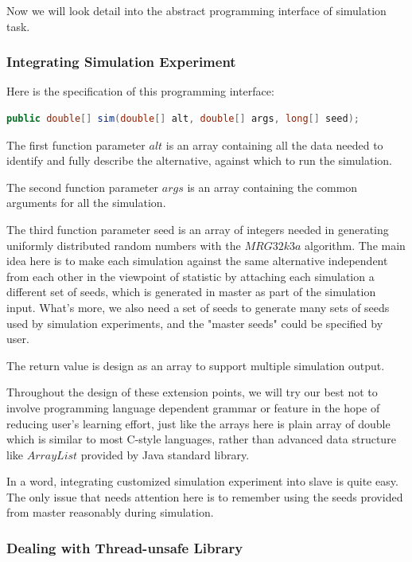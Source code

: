 Now we will look detail into the abstract programming interface of simulation task.

\subsubsection{Integrating Simulation Experiment}

Here is the specification of this programming interface:

\begin{lstlisting}[language=Java]
public double[] sim(double[] alt, double[] args, long[] seed);
\end{lstlisting}

The first function parameter $alt$ is an array containing all the data needed to identify and fully describe the alternative, against which to run the simulation.

The second function parameter $args$ is an array containing the common arguments for all the simulation.

The third function parameter seed is an array of integers needed in generating uniformly distributed random numbers with the $MRG32k3a$ algorithm. The main idea here is to make each simulation against the same alternative independent from each other in the viewpoint of statistic by attaching each simulation a different set of seeds, which is generated in master as part of the simulation input. What's more, we also need a set of seeds to generate many sets of seeds used by simulation experiments, and the "master seeds" could be specified by user.

The return value is design as an array to support multiple simulation output.

Throughout the design of these extension points, we will try our best not to involve programming language dependent grammar or feature in the hope of reducing user's learning effort, just like the arrays here is plain array of double which is similar to most C-style languages, rather than advanced data structure like $ArrayList$ provided by Java standard library.

In a word, integrating customized simulation experiment into slave is quite easy. The only issue that needs attention here is to remember using the seeds provided from master reasonably during simulation.

\subsubsection{Dealing with Thread-unsafe Library}

